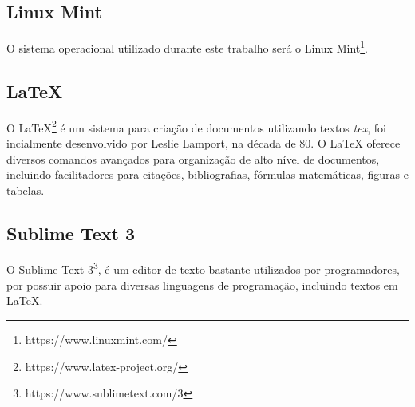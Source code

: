 	\subsection{Linux Mint} %
	\label{sub:linux_mint}
		O sistema operacional utilizado durante este trabalho será o Linux Mint\footnote{https://www.linuxmint.com/}.

	\subsection{LaTeX} %
	\label{sub:latex}
	
	O LaTeX\footnote{https://www.latex-project.org/} é um sistema para criação de documentos utilizando textos \textit{tex}, foi incialmente desenvolvido por Leslie Lamport, na década de 80. O LaTeX oferece diversos comandos avançados para organização de alto nível de documentos, incluindo facilitadores para citações, bibliografias, fórmulas matemáticas, figuras e tabelas.

	\subsection{Sublime Text 3} %
	\label{sub:sublime_text_3}
		O Sublime Text 3\footnote{https://www.sublimetext.com/3}, é um editor de texto bastante utilizados por programadores, por possuir apoio para diversas linguagens de programação, incluindo textos em LaTeX.

	

